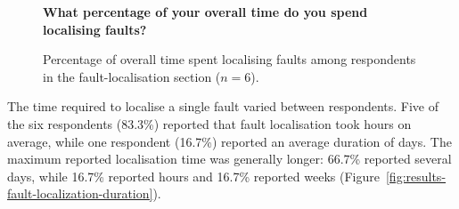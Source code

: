 \begin{figure}[H]
    \centering
    \textbf{\small
    What percentage of your overall time do you spend localising faults?}

    \vspace{0.5em}
    \caption{Percentage of overall time spent localising faults
    among respondents in the fault-localisation section ($n=6$).}
    \label{fig:results-fault-localization-time}
\end{figure}


The time required to localise a single fault varied between respondents.
Five of the six respondents (83.3\%) reported that fault localisation took
hours on average, while one respondent (16.7\%) reported an average duration
of days. The maximum reported localisation time was generally longer:
66.7\% reported several days, while 16.7\% reported hours and 16.7\%
reported weeks (Figure~\ref{fig:results-fault-localization-duration}).

